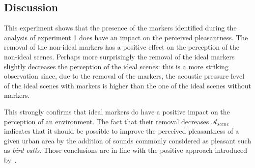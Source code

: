 \documentclass[12pt]{elsarticle}
\begin{document}
\subsection{Discussion}


This experiment shows that the presence of the markers identified during the analysis of experiment 1 does have an impact on the perceived pleasantness. The removal of the non-ideal markers has a positive effect on the perception of the non-ideal scenes. Perhaps more surprisingly the removal of the ideal markers slightly decreases the perception of the ideal scenes: this is a more striking observation since, due to the removal of the markers, the acoustic pressure level of the ideal scenes with markers is higher than the one of the ideal scenes without markers.



This strongly confirms that ideal markers do have a positive impact on the perception of an environment. The fact that their removal decreases $\mathcal{A}_{scene}$ indicates that it should be possible to improve the perceived pleasantness of a given urban area by the addition of sounds commonly considered as pleasant such as \emph{bird calls}. Those conclusions are in line with the positive approach introduced by~\cite{schafer1977tuning}.

\end{document}
